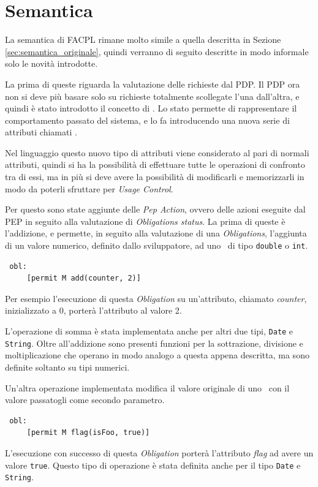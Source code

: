 \section{Semantica} %
\label{sec:semantica}
La semantica di FACPL rimane molto simile a quella descritta in Sezione \ref{sec:semantica_originale}, quindi verranno di seguito descritte in modo informale solo le novità introdotte.\\ \par
La prima di queste riguarda la valutazione delle richieste dal \ac{PDP}. Il \ac{PDP} ora non si deve più basare solo su richieste totalmente scollegate l'una dall'altra, e quindi è stato introdotto il concetto di \status.
Lo stato permette di rappresentare il comportamento passato del sistema, e lo fa introducendo una nuova serie di attributi chiamati \statusattribute.\\ \par
Nel linguaggio questo nuovo tipo di attributi viene considerato al pari di normali attributi, quindi si ha la possibilità di effettuare tutte le operazioni di confronto tra di essi, ma in più si deve avere la possibilità di modificarli e memorizzarli in modo da poterli sfruttare per \textit{Usage Control}.\\ \par

Per questo sono state aggiunte delle \textit{Pep Action}, ovvero delle azioni eseguite dal \ac{PEP} in seguito alla valutazione di \textit{Obligations status}. La prima di queste è l'addizione, 
 e permette, in seguito alla valutazione di una \textit{Obligations}, l'aggiunta di un valore numerico, definito dallo sviluppatore, ad uno \statusattribute \ di tipo \texttt{double} o \texttt{int}. 
\begin{verbatim}
 obl:
     [permit M add(counter, 2)]
\end{verbatim}
Per esempio l'esecuzione di questa \textit{Obligation} su un'attributo, chiamato \textit{counter}, inizializzato a $0$, porterà l'attributo al 
valore 2. 

L'operazione di somma è stata implementata anche per altri due tipi, \texttt{Date} e \texttt{String}.
Oltre all'addizione sono presenti funzioni per la sottrazione, divisione e moltiplicazione che operano in modo analogo a questa appena descritta, ma sono definite soltanto su tipi numerici.

Un'altra operazione implementata modifica il valore originale di uno \statusattribute \ con il valore passatogli come secondo parametro.
\begin{verbatim}
 obl:
     [permit M flag(isFoo, true)]
\end{verbatim}
L'esecuzione con successo di questa \textit{Obligation} porterà l'attributo \textit{flag} ad avere un valore \texttt{true}. Questo tipo di operazione è stata definita anche per il tipo \texttt{Date} e \texttt{String}.

